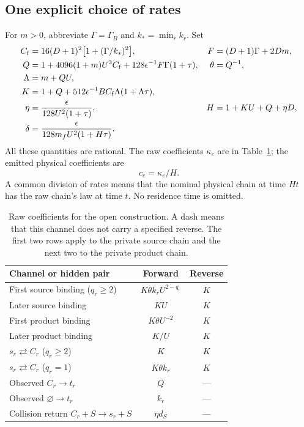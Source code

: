 \documentclass[11pt,reqno]{amsart}
\theoremstyle{definition}
\theoremstyle{remark}
\begin{document}
\subsection{One explicit choice of rates}
For $m>0$, abbreviate $\Gamma=\Gamma_B$ and $k_* =\min_r k_r$. Set
\begin{align}
 C_{\rm f}&=16(D+1)^2\bigl[1+(\Gamma/k_*)^2\bigr],
 &F&=(D+1)\Gamma+2Dm,\label{eq:CfF}\\
 Q&=1+4096(1+m)U^3C_{\rm f}
       +128\epsilon^{-1}F\Gamma(1+\tau),
 &\theta&=Q^{-1},\label{eq:Q}\\
 \Lambda&=m+QU,\label{eq:Lambda}\\
 K&=1+Q+512\epsilon^{-1}BC_{\rm f}\Lambda(1+\Lambda\tau),\label{eq:K}\\
 \eta&=\frac{\epsilon}{128U^2(1+\tau)},
 &H&=1+KU+Q+\eta D,\label{eq:etaH}\\
 \delta&=\frac{\epsilon}{128m_fU^2(1+H\tau)}.\label{eq:delta}
\end{align}
All these quantities are rational. The raw coefficients $\kappa_e$ are in
Table~\ref{tab:raw-rates}; the emitted physical coefficients are
\begin{equation}\label{eq:physical-rates}
 c_e=\kappa_e/H.
\end{equation}
A common division of rates means that the nominal physical chain at time
$Ht$ has the raw chain's law at time $t$. No residence time is omitted.

\begin{table}[tb]
\centering\small
\begin{tabular}{p{.49\linewidth}cc}
\toprule
Channel or hidden pair & Forward & Reverse\\\midrule
First source binding ($q_r\ge2$) & $K\theta k_r U^{2-q_r}$ & $K$\\
Later source binding & $KU$ & $K$\\
First product binding & $K\theta U^{-2}$ & $K$\\
Later product binding & $K/U$ & $K$\\
$s_r\rightleftarrows C_r$ ($q_r\ge2$) & $K$ & $K$\\
$s_r\rightleftarrows C_r$ ($q_r=1$) & $K\theta k_r$ & $K$\\
Observed $C_r\to t_r$ & $Q$ & ---\\
Observed $\varnothing\to t_r$ & $k_r$ & ---\\
Collision return $C_r+S\to s_r+S$ & $\eta d_S$ & ---\\
\bottomrule
\end{tabular}
\caption{Raw coefficients for the open construction. A dash means that this
channel does not carry a specified reverse. The first two rows apply to the
private source chain and the next two to the private product chain.}
\label{tab:raw-rates}
\end{table}
\end{document}
